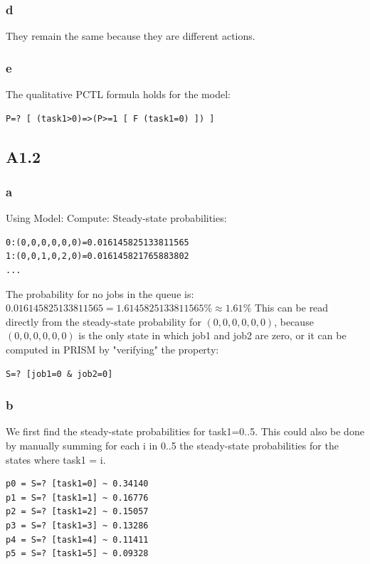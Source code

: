 \subsubsection{d}
They remain the same because they are different actions.

\subsubsection{e}
The qualitative PCTL formula holds for the model:
\begin{verbatim}
P=? [ (task1>0)=>(P>=1 [ F (task1=0) ]) ]
\end{verbatim}

\subsection{A1.2}

\subsubsection{a}

Using Model: Compute: Steady-state probabilities:

\begin{verbatim}
0:(0,0,0,0,0,0)=0.016145825133811565
1:(0,0,1,0,2,0)=0.016145821765883802
...
\end{verbatim}

The probability for no jobs in the queue is: $0.016145825133811565 = 1.6145825133811565\% \approx 1.61\%$
This can be read directly from the steady-state probability for $(0,0,0,0,0,0)$,
because $(0,0,0,0,0,0)$ is the only state in which job1 and job2 are zero,
or it can be computed in PRISM by "verifying" the property:

\begin{verbatim}
S=? [job1=0 & job2=0]
\end{verbatim}

\subsubsection{b}

We first find the steady-state probabilities for task1=0..5.
This could also be done by manually summing for each i in 0..5
the steady-state probabilities for the states where task1 = i.

\begin{verbatim}
p0 = S=? [task1=0] ~ 0.34140
p1 = S=? [task1=1] ~ 0.16776
p2 = S=? [task1=2] ~ 0.15057
p3 = S=? [task1=3] ~ 0.13286
p4 = S=? [task1=4] ~ 0.11411
p5 = S=? [task1=5] ~ 0.09328
\end{verbatim}

